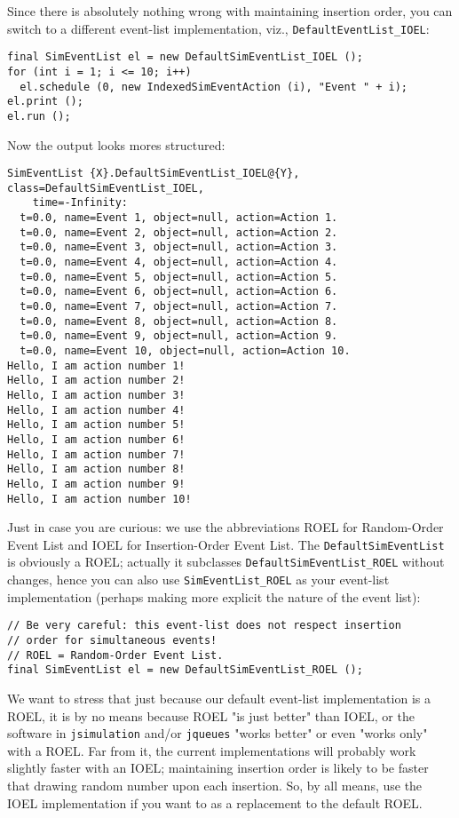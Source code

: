 \documentclass[12pt]{book}
\begin{document}
Since there is absolutely nothing wrong with maintaining insertion order,
  you can switch to a different event-list implementation, viz., \lstinline{DefaultEventList_IOEL}:
\begin{lstlisting}[basicstyle=\tiny]
final SimEventList el = new DefaultSimEventList_IOEL ();
for (int i = 1; i <= 10; i++)
  el.schedule (0, new IndexedSimEventAction (i), "Event " + i);
el.print ();
el.run ();
\end{lstlisting}
Now the output looks mores structured:
\begin{lstlisting}[basicstyle=\tiny]
SimEventList {X}.DefaultSimEventList_IOEL@{Y}, class=DefaultSimEventList_IOEL,
    time=-Infinity:
  t=0.0, name=Event 1, object=null, action=Action 1.
  t=0.0, name=Event 2, object=null, action=Action 2.
  t=0.0, name=Event 3, object=null, action=Action 3.
  t=0.0, name=Event 4, object=null, action=Action 4.
  t=0.0, name=Event 5, object=null, action=Action 5.
  t=0.0, name=Event 6, object=null, action=Action 6.
  t=0.0, name=Event 7, object=null, action=Action 7.
  t=0.0, name=Event 8, object=null, action=Action 8.
  t=0.0, name=Event 9, object=null, action=Action 9.
  t=0.0, name=Event 10, object=null, action=Action 10.
Hello, I am action number 1!
Hello, I am action number 2!
Hello, I am action number 3!
Hello, I am action number 4!
Hello, I am action number 5!
Hello, I am action number 6!
Hello, I am action number 7!
Hello, I am action number 8!
Hello, I am action number 9!
Hello, I am action number 10!
\end{lstlisting}
Just in case you are curious: we use the abbreviations ROEL for Random-Order Event List
  and IOEL for Insertion-Order Event List.
The \lstinline|DefaultSimEventList| is obviously a ROEL; actually it
  subclasses \lstinline|DefaultSimEventList_ROEL| without changes,
  hence you can also use \lstinline|SimEventList_ROEL|
  as your event-list implementation
  (perhaps making more explicit the nature of the event list):
\begin{lstlisting}[basicstyle=\tiny]
// Be very careful: this event-list does not respect insertion
// order for simultaneous events!
// ROEL = Random-Order Event List.
final SimEventList el = new DefaultSimEventList_ROEL ();
\end{lstlisting}

We want to stress that just because our default event-list implementation is
  a ROEL, it is by no means because ROEL "is just better" than IOEL,
  or the software in \lstinline|jsimulation| and/or \lstinline|jqueues|
  "works better" or even "works only" with a ROEL.
Far from it, the current implementations will probably work slightly faster
  with an IOEL; maintaining insertion order is likely to be faster
  that drawing random number upon each insertion.
So, by all means, use the IOEL implementation if you want to as a
  replacement to the default ROEL.
\end{document}
